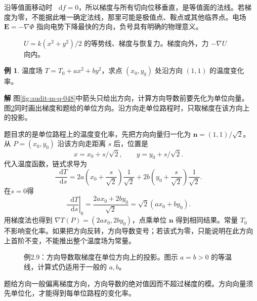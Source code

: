 \documentclass[11pt,openany,fontset=fandol]{ctexbook}
\theoremstyle{plain}\newtheorem{theorem}{定理}[chapter]\newtheorem{proposition}[theorem]{命题}
\theoremstyle{definition}\newtheorem{definition}{定义}[chapter]\newtheorem{example}{例}[chapter]
\theoremstyle{remark}\newtheorem*{remark}{说明}
\newcommand{\SolutionStart}{\par\nobreak\medskip\nobreak\noindent\textbf{解}\quad\ignorespaces}
\newenvironment{solution}{\SolutionStart}{\par\medskip}
\newcommand{\dd}{\mathop{}\!\mathrm d}\newcommand{\ii}{\mathrm i}\newcommand{\ee}{\mathrm e}
\newcommand{\vct}[1]{\bm{#1}}\newcommand{\Rea}{\operatorname{Re}}\newcommand{\Ima}{\operatorname{Im}}
\begin{document}
沿等值面移动时 $\dd f=0$，所以梯度与所有切向位移垂直，是等值面的法线。若梯度为零，不能据此唯一确定法线，那里可能是极值点、鞍点或其他临界点。电场 $\vct E=-\nabla\Phi$ 指向电势下降最快的方向，负号具有明确的物理意义。
\begin{figure}[htbp]\centering
{}
\caption{$U=k(x^2+y^2)/2$ 的等势线、梯度与恢复力。梯度向外，力 $-\nabla U$ 向内。}
\label{fig:orig-036}
\end{figure}

\begin{example}
温度场 $T=T_0+ax^2+by^2$，求点 $(x_0,y_0)$ 处沿方向 $(1,1)$ 的温度变化率。
\end{example}

\begin{solution}
图\ref{fig:audit-m-q-048}中箭头只给出方向，计算方向导数前要先化为单位向量。
图\ref{fig:eg-2-9}同时画出梯度和题给的单位方向。沿方向走单位路程时，只取梯度在该方向上的投影。

题目求的是单位路程上的温度变化率，先把方向向量归一化为 $\vct n=(1,1)/\sqrt2$。从 $P=(x_0,y_0)$ 沿该方向走距离 $s$ 后，位置是
\[
x=x_0+s/\sqrt2,\qquad y=y_0+s/\sqrt2.
\]
代入温度函数，链式求导为
\[\frac{\dd T}{\dd s}
=2a\left(x_0+\frac s{\sqrt2}\right)\frac1{\sqrt2}
+2b\left(y_0+\frac s{\sqrt2}\right)\frac1{\sqrt2}.\]
在$s=0$得
\[
\left.\frac{\dd T}{\dd s}\right|_0
=\frac{2ax_0+2by_0}{\sqrt2}
=\sqrt2(ax_0+by_0).
\]
用梯度法也得到 $\nabla T(P)=(2ax_0,2by_0)$，点乘单位 $\vct n$ 得到相同结果。常量 $T_0$ 不影响变化率。如果把方向反转，方向导数变号；若该式为零，只能说明在此方向上首阶不变，不能推出整个温度场为常量。

\begin{figure}[H]\centering
{}
\caption{例2.9：方向导数取梯度在单位方向上的投影。图示 $a=b>0$ 的等温线，计算式仍适用于一般的 $a,b$。}\label{fig:eg-2-9}
\end{figure}

题给方向一般偏离梯度方向，方向导数的绝对值因而不超过梯度的模。方向向量须先单位化，才能得到每单位路程的变化率。
\end{solution}
\end{document}
